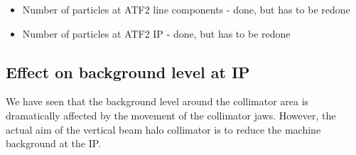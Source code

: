 \begin{itemize}
 \item Number of particles at ATF2 line components - done, but has to be redone
 \item Number of particles at ATF2 IP - done, but has to be redone
\end{itemize}

\subsection{Effect on background level at IP}
\label{collimator_bkg_IP}
We have seen that the background level around the collimator area is dramatically affected by the movement of the collimator jaws. 
However, the actual aim of the vertical beam halo collimator is to reduce the machine background at the IP.

